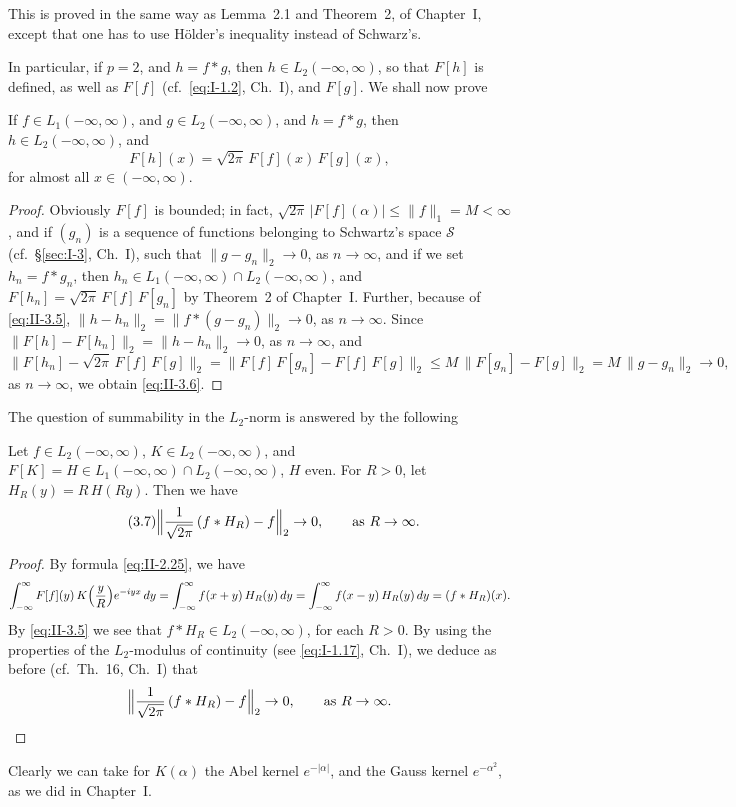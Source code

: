 This is proved in the same way as Lemma~2.1 and Theorem~2, of Chapter~I, except that one has to use H\"older's inequality instead of Schwarz's.

In particular, if $p=2$, and $h=f*g$, then $h\in L_{2}(-\infty,\infty)$, so that $F[h]$ is defined, as well as $F[f]$ (cf.\ \eqref{eq:I-1.2}, Ch.~I), and $F[g]$. We shall now prove

\begin{theorem}\label{thm:II-4}
If $f\in L_{1}(-\infty,\infty)$, and $g\in L_{2}(-\infty,\infty)$, and $h=f*g$, then $h\in L_{2}(-\infty,\infty)$, and
\begin{equation*}\tag{3.6}\label{eq:II-3.6}
F[h](x)=\sqrt{2\pi}\,F[f](x)\,F[g](x),
\end{equation*}
for almost all $x\in(-\infty,\infty)$.
\end{theorem}
\begin{proof}
Obviously $F[f]$ is bounded; in fact, $\sqrt{2\pi}\,|F[f](\alpha)|\le \|f\|_{1}=M<\infty$, and if $(g_{n})$ is a sequence of functions belonging to Schwartz's space $\mathcal S$ (cf.\ \S\ref{sec:I-3}, Ch.~I), such that $\|g-g_{n}\|_{2}\to 0$, as $n\to\infty$, and if we set $h_{n}=f*g_{n}$, then $h_{n}\in L_{1}(-\infty,\infty)\cap L_{2}(-\infty,\infty)$, and $F[h_{n}]=\sqrt{2\pi}\,F[f]\,F[g_{n}]$ by Theorem~2 of Chapter~I. Further, because of \eqref{eq:II-3.5}, $\|h-h_{n}\|_{2}=\|f*(g-g_{n})\|_{2}\to 0$, as $n\to\infty$. Since $\|F[h]-F[h_{n}]\|_{2}=\|h-h_{n}\|_{2}\to 0$, as $n\to\infty$, and
\[
\|F[h_{n}]-\sqrt{2\pi}\,F[f]\,F[g]\|_{2}
=\|F[f]\,F[g_{n}]-F[f]\,F[g]\|_{2}
\le M\,\|F[g_{n}]-F[g]\|_{2}
=M\,\|g-g_{n}\|_{2}\to 0,
\]
as $n\to\infty$, we obtain \eqref{eq:II-3.6}.
\end{proof}

The question of summability in the $L_{2}$-norm is answered by the following

\begin{theorem}\label{thm:II-5}
Let $f\in L_{2}(-\infty,\infty)$, $K\in L_{2}(-\infty,\infty)$, and $F[K]=H\in L_{1}(-\infty,\infty)\cap L_{2}(-\infty,\infty)$, $H$ even. For $R>0$, let $H_{R}(y)=R\,H(Ry)$. Then we have
\begin{equation*}\tag{3.7}\label{eq:II-3.7}
\Bigl\|\frac{1}{\sqrt{2\pi}}\,(f*H_{R})-f\Bigr\|_{2}\to 0,\qquad\text{as }R\to\infty.
\end{equation*}
\end{theorem}
\begin{proof}
By formula \eqref{eq:II-2.25}, we have
\[
\int_{-\infty}^{\infty}F[f](y)\,K\Bigl(\frac{y}{R}\Bigr)e^{-iyx}\,dy
=\int_{-\infty}^{\infty}f(x+y)\,H_{R}(y)\,dy
=\int_{-\infty}^{\infty}f(x-y)\,H_{R}(y)\,dy
=(f*H_{R})(x).
\]
By \eqref{eq:II-3.5} we see that $f*H_{R}\in L_{2}(-\infty,\infty)$, for each $R>0$. By using the properties of the $L_{2}$-modulus of continuity (see \eqref{eq:I-1.17}, Ch.~I), we deduce as before (cf.\ Th.~16, Ch.~I) that
\[
\Bigl\|\frac{1}{\sqrt{2\pi}}\,(f*H_{R})-f\Bigr\|_{2}\to 0,\qquad\text{as }R\to\infty.
\]
\end{proof}
\begin{remark}
Clearly we can take for $K(\alpha)$ the Abel kernel $e^{-|\alpha|}$, and the Gauss kernel $e^{-\alpha^{2}}$, as we did in Chapter~I.
\end{remark}

